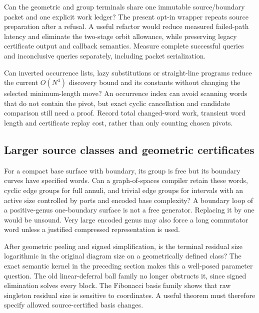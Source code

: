 \begin{question}
Can the geometric and group terminals share one immutable source/boundary
packet and one explicit work ledger? The present opt-in wrapper repeats source
preparation after a refusal. A useful refactor would reduce measured failed-path
latency and eliminate the two-stage orbit allowance, while preserving legacy
certificate output and callback semantics. Measure complete successful queries
and inconclusive queries separately, including packet serialization.
\end{question}

\begin{question}
Can inverted occurrence lists, lazy substitutions or straight-line programs
reduce the current $O(N^4)$ discovery bound and its constants without changing
the selected minimum-length move? An occurrence index can avoid scanning words
that do not contain the pivot, but exact cyclic cancellation and candidate
comparison still need a proof. Record total changed-word work, transient word
length and certificate replay cost, rather than only counting chosen pivots.
\end{question}

\subsection{Larger source classes and geometric certificates}

\begin{question}
For a compact base surface with boundary, its group is free but its boundary
curves have specified words. Can a graph-of-spaces compiler retain these words,
cyclic edge groups for full annuli, and trivial edge groups for intervals with
an active size controlled by ports and encoded base complexity? A boundary loop
of a positive-genus one-boundary surface is not a free generator. Replacing it
by one would be unsound. Very large encoded genus may also force a long
commutator word unless a justified compressed representation is used.
\end{question}

\begin{question}
After geometric peeling and signed simplification, is the terminal residual
size logarithmic in the original diagram size on a geometrically defined
class? The exact semantic kernel in the preceding section makes this a
well-posed parameter question. The old linear-deferral ball family no longer
obstructs it, since signed elimination solves every block. The Fibonacci basis
family shows that raw singleton residual size is sensitive to coordinates.
A useful theorem must therefore specify allowed source-certified basis changes.
\end{question}

